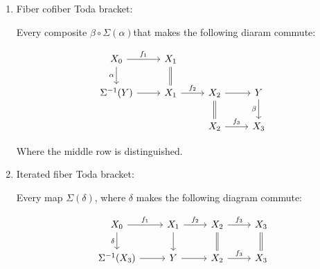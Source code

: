 \begin{definition}
\begin{enumerate}
{            Where the top row is distinguished.
        }
    \item {
            Fiber cofiber Toda bracket:

            Every composite \( \beta \circ \Sigma(\alpha) \)that makes the following diaram commute:

            \[\begin{tikzcd}
                {X_0} & {X_1} \\
                {\Sigma^{-1}(Y)} & {X_1} & {X_2} & {Y} \\
                && {X_2} & {X_3}
                \arrow["{f_1}", from=1-1, to=1-2]
                \arrow[Rightarrow, no head, from=1-2, to=2-2]
                \arrow["{f_2}", from=2-2, to=2-3]
                \arrow[Rightarrow, no head, from=2-3, to=3-3]
                \arrow["{f_3}", from=3-3, to=3-4]
                \arrow[from=2-3, to=2-4]
                \arrow[from=2-1, to=2-2]
                \arrow["\alpha"', from=1-1, to=2-1]
                \arrow["\beta"', from=2-4, to=3-4]
            \end{tikzcd}\]

            Where the middle row is distinguished.
        }
    \item {
        Iterated fiber Toda bracket:

        Every map \( \Sigma(\delta) \), where \( \delta \) makes the following diagram commute:

        \[\begin{tikzcd}
            {X_0} & {X_1} & {X_2} & {X_3} \\
            {\Sigma^{-1}(X_3)} & {Y} & {X_2} & {X_3}
            \arrow["{f_1}", from=1-1, to=1-2]
            \arrow["{f_2}", from=1-2, to=1-3]
            \arrow["{f_3}", from=1-3, to=1-4]
            \arrow["{f_3}", from=2-3, to=2-4]
            \arrow[from=2-2, to=2-3]
            \arrow[from=2-1, to=2-2]
            \arrow["\delta"', from=1-1, to=2-1]
            \arrow[from=1-2, to=2-2]
            \arrow[Rightarrow, no head, from=1-3, to=2-3]
            \arrow[Rightarrow, no head, from=1-4, to=2-4]
        \end{tikzcd}\]

}
\end{enumerate}
\end{definition}
